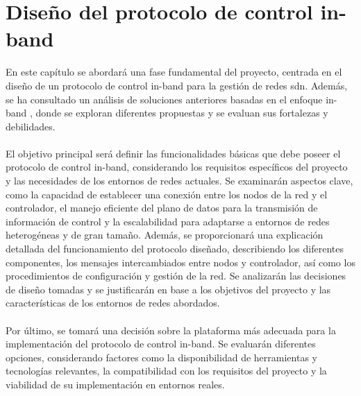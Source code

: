 \chapter{Diseño del protocolo de control in-band}
\label{ch:analisis}

En este capítulo se abordará una fase fundamental del proyecto, centrada en el diseño de un protocolo de control in-band para la gestión de redes \gls{sdn}. Además, se ha consultado un análisis de soluciones anteriores basadas en el enfoque in-band \cite{carrascal2023comprehensive}, donde se exploran diferentes propuestas y se evaluan sus fortalezas y debilidades.\\
\\
El objetivo principal será definir las funcionalidades básicas que debe poseer el protocolo de control in-band, considerando los requisitos específicos del proyecto y las necesidades de los entornos de redes actuales. Se examinarán aspectos clave, como la capacidad de establecer una conexión entre los nodos de la red y el controlador, el manejo eficiente del plano de datos para la transmisión de información de control y la escalabilidad para adaptarse a entornos de redes heterogéneas y de gran tamaño. Además, se proporcionará una explicación detallada del funcionamiento del protocolo diseñado, describiendo los diferentes componentes, los mensajes intercambiados entre nodos y controlador, así como los procedimientos de configuración y gestión de la red. Se analizarán las decisiones de diseño tomadas y se justificarán en base a los objetivos del proyecto y las características de los entornos de redes abordados.\\
\\
Por último, se tomará una decisión sobre la plataforma más adecuada para la implementación del protocolo de control in-band. Se evaluarán diferentes opciones, considerando factores como la disponibilidad de herramientas y tecnologías relevantes, la compatibilidad con los requisitos del proyecto y la viabilidad de su implementación en entornos reales.







